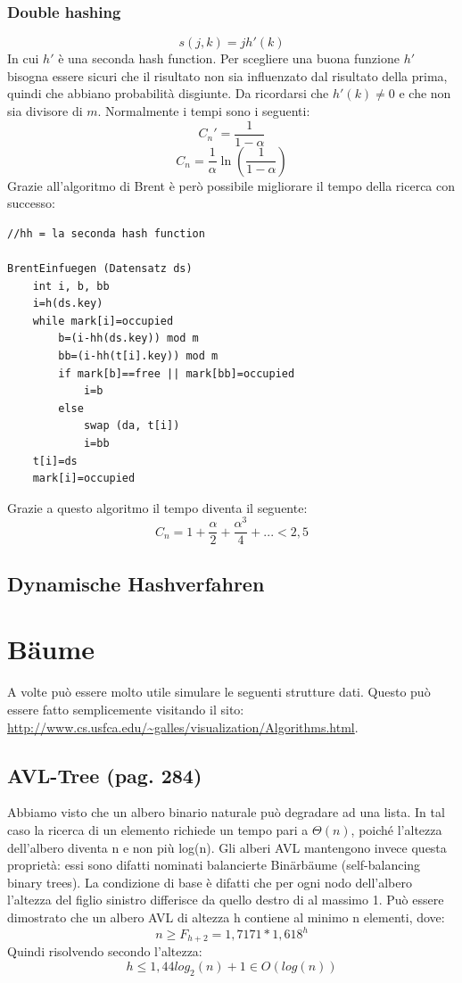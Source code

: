 \documentclass[a4paper]{book}
\begin{document}
\subsection{Double hashing}
$$s(j,k)=jh'(k) $$
In cui $h'$ è una seconda hash function. Per scegliere una buona funzione $h'$ bisogna essere sicuri che il risultato non sia influenzato dal risultato della prima, quindi che abbiano probabilità disgiunte. Da ricordarsi che $h'(k) \neq 0$ e che non sia divisore di $m$. Normalmente i tempi sono i seguenti:
$$ C_n '= \frac{1}{1-\alpha} $$
$$ C_n = \frac{1}{\alpha} \ln (\frac{1}{1-\alpha})$$
Grazie all'algoritmo di Brent è però possibile migliorare il tempo della ricerca con successo:
\begin{lstlisting}
//hh = la seconda hash function

BrentEinfuegen (Datensatz ds)
	int i, b, bb
	i=h(ds.key)
	while mark[i]=occupied
		b=(i-hh(ds.key)) mod m
		bb=(i-hh(t[i].key)) mod m
		if mark[b]==free || mark[bb]=occupied
			i=b
		else
			swap (da, t[i])
			i=bb
	t[i]=ds
	mark[i]=occupied			
\end{lstlisting}
Grazie a questo algoritmo il tempo diventa il seguente:
$$C_n = 1+\frac{\alpha}{2}+\frac{\alpha ^3}{4}+... <2,5$$
\section{Dynamische Hashverfahren}
\chapter{Bäume}
A volte può essere molto utile simulare le seguenti strutture dati. Questo può essere fatto semplicemente visitando il sito: \url{http://www.cs.usfca.edu/~galles/visualization/Algorithms.html}.
\section{AVL-Tree (pag. 284)}
Abbiamo visto che un albero binario naturale può degradare ad una lista. In tal caso la ricerca di un elemento richiede un tempo pari a $\Theta (n)$, poiché l'altezza dell'albero diventa n e non più log(n). Gli alberi AVL mantengono invece questa proprietà: essi sono difatti nominati balancierte Binärbäume (self-balancing binary trees). La condizione di base è difatti che per ogni nodo dell'albero l'altezza del figlio sinistro differisce da quello destro di al massimo 1. Può essere dimostrato che un albero AVL di altezza h contiene al minimo n elementi, dove:
$$ n\geq F_{h+2} = 1,7171*1,618^h$$
Quindi risolvendo secondo l'altezza:
$$ h\leq 1,44 log_2 (n)+1 \in O(log(n))$$
\end{document}
